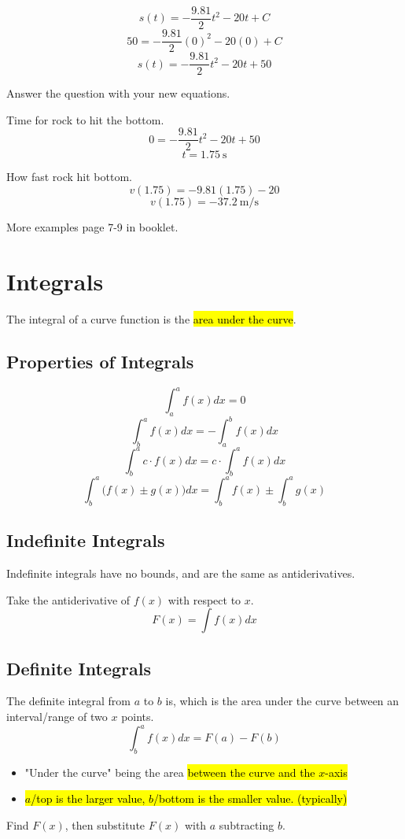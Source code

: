 \documentclass[a4paper,12pt]{article}
\begin{document}
$$s(t) = -\frac{9.81}{2}t^2 - 20t + C$$
$$50 = -\frac{9.81}{2}(0)^2 - 20(0) + C$$
$$s(t) = -\frac{9.81}{2}t^2 - 20t + 50$$

Answer the question with your new equations.

Time for rock to hit the bottom.
$$0 = -\frac{9.81}{2}t^2 - 20t + 50$$
$$t = \SI{1.75}{\s}$$

How fast rock hit bottom.
$$v(1.75) = -9.81(1.75) - 20$$
$$v(1.75) = \SI{-37.2}{\m/\s}$$

More examples page 7-9 in booklet.

\pagebreak

\section{Integrals}
The integral of a curve function is the \hl{area under the curve}.

\subsection{Properties of Integrals}
$$\int_a^a{f(x)}dx = 0$$
$$\int^a_b{f(x)}dx = -\int^b_a{f(x)}dx$$
$$\int^a_b{c \cdot f(x)}dx = c\cdot\int^a_b{f(x)}dx$$
$$\int^a_b{\Big( f(x) \pm g(x) \Big)}dx = \int^a_b{f(x)} \pm \int^a_b{g(x)}$$

\subsection{Indefinite Integrals}
Indefinite integrals have no bounds, and are the same as antiderivatives.

Take the antiderivative of $f(x)$ with respect to $x$.
$$F(x) = \int{f(x)}dx$$

\subsection{Definite Integrals}
The definite integral from $a$ to $b$ is, which is the area under the curve between an interval/range of two $x$ points.
$$\int^a_b{f(x)}dx = F(a) - F(b)$$

\begin{itemize}
    \item{"Under the curve" being the area \hl{between the curve and the $x$-axis}}
    \item{\hl{$a$/top is the larger value, $b$/bottom is the smaller value. (typically)}}
\end{itemize}

Find $F(x)$, then substitute $F(x)$ with $a$ subtracting $b$. 
\end{document}
